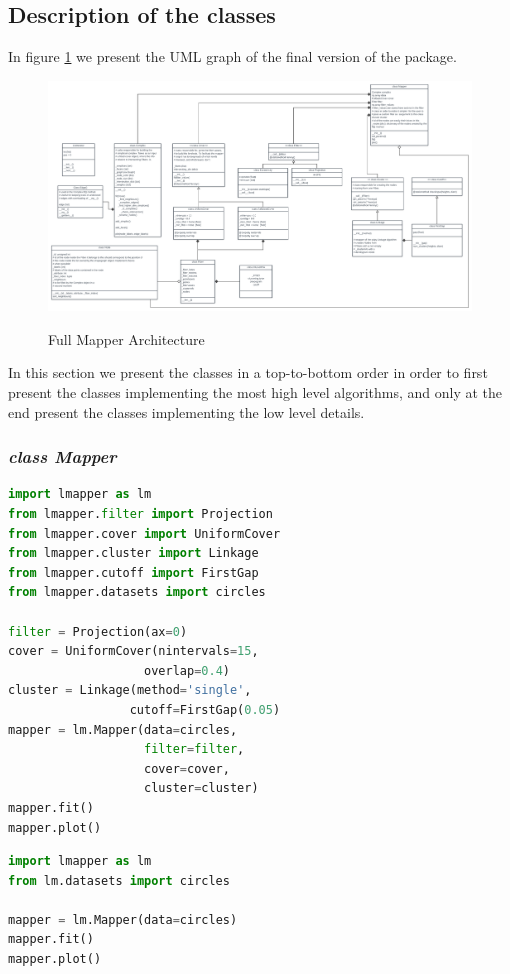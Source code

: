 \subsection{Description of the classes}
In figure \ref{fig:fullmapperarchitecture} we present the UML graph of the final version of the package.
\begin{figure}[h]
	\caption{Full Mapper Architecture}
	\centering
	\includegraphics[width=1\textwidth]{Figs/fullMapperArchitecture.png}
	\label{fig:fullmapperarchitecture}
\end{figure} 
In this section we present the classes in a top-to-bottom order in order to first present the classes implementing the most high level algorithms, and only at the end present the classes implementing the low level details.

\subsubsection{\textit{class Mapper}}
\begin{lstlisting}[language=Python, caption=Example for the Mapper class]
import lmapper as lm
from lmapper.filter import Projection
from lmapper.cover import UniformCover
from lmapper.cluster import Linkage
from lmapper.cutoff import FirstGap
from lmapper.datasets import circles

filter = Projection(ax=0)
cover = UniformCover(nintervals=15,
                   overlap=0.4)
cluster = Linkage(method='single',
                 cutoff=FirstGap(0.05)
mapper = lm.Mapper(data=circles,
                   filter=filter,
                   cover=cover,
                   cluster=cluster)
mapper.fit()
mapper.plot()
\end{lstlisting}

\begin{lstlisting}[language=Python, caption=Example 2 for the Mapper class. The Mapper object can be initialized just with the data matrix.]
import lmapper as lm
from lm.datasets import circles

mapper = lm.Mapper(data=circles)
mapper.fit()
mapper.plot()
\end{lstlisting}

